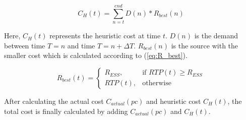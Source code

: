 \begin{equation}
\label{eq:C_H}
C_H(t) = \sum_{n=t}^{end} D(n)*R_{best}(n)
\end{equation}

Here, $C_H(t)$ represents the heuristic cost at time $t$. $D(n)$ is the demand between time $T = n$ and time $T = n+\Delta T$. $R_{best}(n)$ is the source with the smaller cost which is calculated according to (\ref{eq:R_best}).

\begin{equation}
\label{eq:R_best}
R_{best}(t) = 
\begin{cases}
    R_{ESS},& \text{if } RTP(t)\geq R_{ESS}\\
    RTP(t),              & \text{otherwise}
\end{cases}
\end{equation}

After calculating the actual cost  $C_{actual}(pc)$ and heuristic cost $C_H(t)$, the total cost is finally calculated by adding  $C_{actual}(pc)$ and $C_H(t)$.




